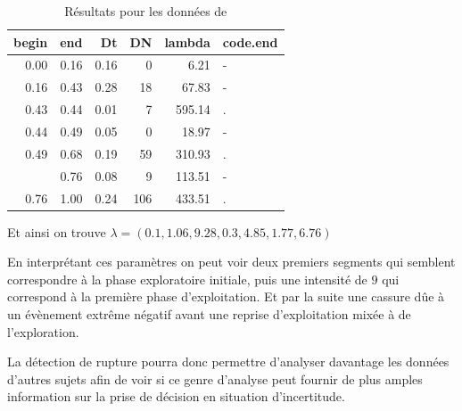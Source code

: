 \documentclass[a4paper,10pt]{article}\usepackage[]{graphicx}\usepackage[]{xcolor}
\newenvironment{knitrout}{}{} %
\begin{document}
\begin{table}[!h]
    \centering
\begin{knitrout}
\color{fgcolor}
\begin{tabular}{rrrrrl}
\toprule
begin & end & Dt & DN & lambda & code.end\\
\midrule
0.00 & 0.16 & 0.16 & 0 & 6.21 & -\\
0.16 & 0.43 & 0.28 & 18 & 67.83 & -\\
0.43 & 0.44 & 0.01 & 7 & 595.14 & .\\
0.44 & 0.49 & 0.05 & 0 & 18.97 & -\\
0.49 & 0.68 & 0.19 & 59 & 310.93 & .\\
\addlinespace
0.68 & 0.76 & 0.08 & 9 & 113.51 & -\\
0.76 & 1.00 & 0.24 & 106 & 433.51 & .\\
\bottomrule
\end{tabular}

\end{knitrout}
    \caption{Résultats pour les données de \cite{soubeyrandDonneesTheseExperience2024}}
    \label{tab:resultat-soub-cv}
\end{table}

Et ainsi on trouve $\lambda = (0.1, 1.06, 9.28, 0.3, 4.85, 1.77, 6.76)$

En interprétant ces paramètres on peut voir deux premiers segments qui semblent
correspondre à la phase exploratoire initiale, puis une intensité de $9$ qui 
correspond à la première phase d'exploitation. Et par la suite une cassure dûe
à un évènement extrême négatif avant une reprise d'exploitation mixée à de 
l'exploration.

La détection de rupture pourra donc permettre d'analyser davantage les données 
d'autres sujets afin de voir si ce genre d'analyse peut fournir de plus amples
information sur la prise de décision en situation d'incertitude.

\printbibliography
\nocite{*}
\end{document}
